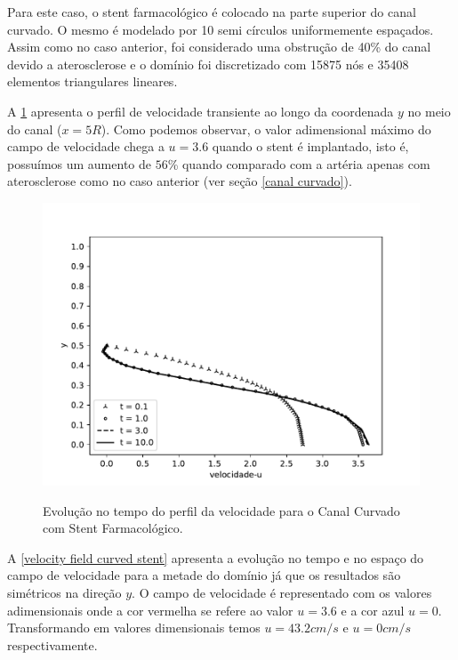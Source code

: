 Para este caso, o stent farmacológico é colocado na parte superior 
do canal curvado. O mesmo é modelado por 10 semi círculos uniformemente
espaçados. Assim como no caso anterior, foi considerado uma obstrução
de 40\% do canal devido a aterosclerose e o domínio foi
discretizado com 15875 nós e 35408 elementos triangulares lineares. \par
A \ref{velocity evolution curved stent} apresenta o perfil
de velocidade transiente ao longo da coordenada $y$ no
meio do canal ($x=5R$). 
Como podemos observar, 
o valor adimensional máximo do campo de velocidade
chega a $u=3.6$ quando o stent é implantado, isto é,
possuímos um aumento de $56$\% quando comparado com
a artéria apenas com aterosclerose como no caso anterior (ver seção \ref{canal curvado}).

\begin{figure}[H]
     \centering
     \includegraphics[scale=1]{./02_chaps/cap_solution/figure/vel_CurvedStrut_evol.pdf}\\
     \caption{Evolução no tempo do perfil da velocidade para o Canal Curvado com Stent Farmacológico.}
     \label{velocity evolution curved stent}
\end{figure}

\newpage
A \ref{velocity field curved stent} apresenta a evolução no tempo e no espaço
do campo de velocidade para a metade do domínio já que os resultados são simétricos
na direção $y$. O campo de velocidade é representado com os valores adimensionais
onde a cor vermelha se refere ao valor $u=3.6$ e a cor azul $u=0$. 
Transformando em valores dimensionais temos $u=43.2 cm/s$ e $u=0 cm/s$ respectivamente. 

